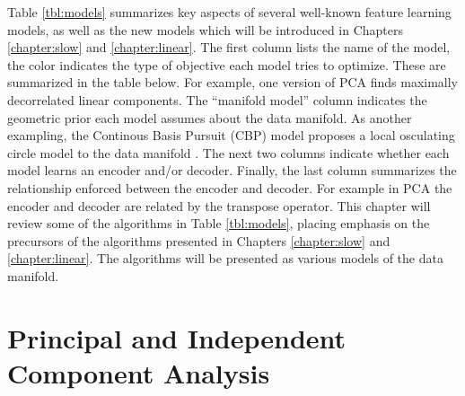 Table \ref{tbl:models} summarizes key aspects of several well-known feature
learning models, as well as the new models which will be introduced in Chapters
\ref{chapter:slow} and \ref{chapter:linear}. The first column lists the name of
the model, the color indicates the type of objective each model tries to
optimize.  These are summarized in the table below. For example, one version of
PCA finds maximally decorrelated linear components. The ``manifold model''
column indicates the geometric prior each model assumes about the data
manifold. As another exampling,  the Continous Basis Pursuit (CBP) model
proposes a local osculating circle model to the data manifold \cite{CBP}.  The
next two columns indicate whether each model learns an encoder and/or decoder.
Finally, the last column summarizes the relationship enforced between the
encoder and decoder. For example in PCA the encoder and decoder are related by
the transpose operator. This chapter will review some of the algorithms in
Table \ref{tbl:models}, placing emphasis on the precursors of the algorithms
presented in Chapters \ref{chapter:slow} and \ref{chapter:linear}. The
algorithms will be presented as various models of the data manifold.

\section{Principal and Independent Component Analysis} 


